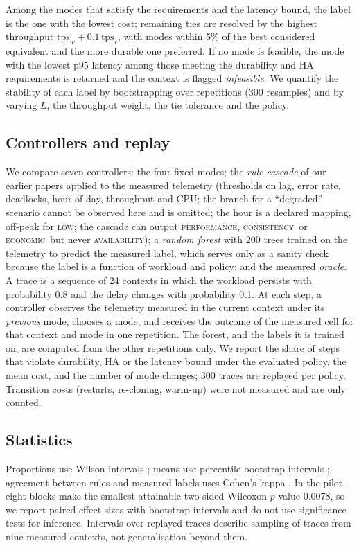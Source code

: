 \documentclass[preprint,12pt]{elsarticle}
\newcommand{\perf}{\textsc{performance}}
\newcommand{\cons}{\textsc{consistency}}
\newcommand{\avail}{\textsc{availability}}
\newcommand{\econ}{\textsc{economic}}
\begin{document}
Among the modes that satisfy the requirements and the latency bound, the label is the one with the lowest cost; remaining ties are resolved by the highest throughput $\text{tps}_w+0.1\,\text{tps}_r$, with modes within 5\% of the best considered equivalent and the more durable one preferred. If no mode is feasible, the mode with the lowest p95 latency among those meeting the durability and HA requirements is returned and the context is flagged \emph{infeasible}. We quantify the stability of each label by bootstrapping over repetitions (300 resamples) and by varying $L$, the throughput weight, the tie tolerance and the policy.

\subsection{Controllers and replay}\label{sec:replay}
We compare seven controllers: the four fixed modes; the \emph{rule cascade} of our earlier papers applied to the measured telemetry (thresholds on lag, error rate, deadlocks, hour of day, throughput and CPU; the branch for a ``degraded'' scenario cannot be observed here and is omitted; the hour is a declared mapping, off-peak for \textsc{low}; the cascade can output \perf, \cons\ or \econ\ but never \avail); a \emph{random forest} \cite{breiman2001} with 200 trees trained on the telemetry to predict the measured label, which serves only as a sanity check because the label is a function of workload and policy; and the measured \emph{oracle}. A trace is a sequence of 24 contexts in which the workload persists with probability 0.8 and the delay changes with probability 0.1. At each step, a controller observes the telemetry measured in the current context under its \emph{previous} mode, chooses a mode, and receives the outcome of the measured cell for that context and mode in one repetition. The forest, and the labels it is trained on, are computed from the other repetitions only. We report the share of steps that violate durability, HA or the latency bound under the evaluated policy, the mean cost, and the number of mode changes; 300 traces are replayed per policy. Transition costs (restarts, re-cloning, warm-up) were not measured and are only counted.

\subsection{Statistics}\label{sec:stats}
Proportions use Wilson intervals \cite{wilson1927}; means use percentile bootstrap intervals \cite{efron1979}; agreement between rules and measured labels uses Cohen's kappa \cite{cohen1960}. In the pilot, eight blocks make the smallest attainable two-sided Wilcoxon $p$-value 0.0078, so we report paired effect sizes with bootstrap intervals and do not use significance tests for inference. Intervals over replayed traces describe sampling of traces from nine measured contexts, not generalisation beyond them.
\end{document}

